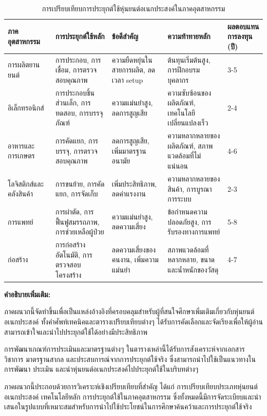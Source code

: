 \documentclass[a4paper]{article}
\begin{document}
\begin{table}[!htbp]
\centering
\small
\caption{การเปรียบเทียบการประยุกต์ใช้หุ่นยนต์อเนกประสงค์ในภาคอุตสาหกรรม}
\begin{tabular}{|p{3cm}|p{4cm}|p{3cm}|p{3cm}|p{2.5cm}|}
\hline
\textbf{ภาคอุตสาหกรรม} & \textbf{การประยุกต์ใช้หลัก} & \textbf{ข้อดีสำคัญ} & \textbf{ความท้าทายหลัก} & \textbf{ผลตอบแทนการลงทุน (ปี)} \\
\hline
การผลิตยานยนต์ & การประกอบ, การเชื่อม, การตรวจสอบคุณภาพ & ความยืดหยุ่นในสายการผลิต, ลดเวลา setup & ต้นทุนเริ่มต้นสูง, การฝึกอบรมบุคลากร & 3-5 \\
\hline
อิเล็กทรอนิกส์ & การประกอบชิ้นส่วนเล็ก, การทดสอบ, การบรรจุภัณฑ์ & ความแม่นยำสูง, ลดการสูญเสีย & ความซับซ้อนของผลิตภัณฑ์, เทคโนโลยีเปลี่ยนแปลงเร็ว & 2-4 \\
\hline
อาหารและการเกษตร & การคัดแยก, การบรรจุ, การตรวจสอบคุณภาพ & ลดการสูญเสีย, เพิ่มมาตรฐานอนามัย & ความหลากหลายของผลิตภัณฑ์, สภาพแวดล้อมที่ไม่แน่นอน & 4-6 \\
\hline
โลจิสติกส์และคลังสินค้า & การขนย้าย, การคัดแยก, การจัดเก็บ & เพิ่มประสิทธิภาพ, ลดค่าแรงงาน & ความหลากหลายของสินค้า, การบูรณาการระบบ & 2-3 \\
\hline
การแพทย์ & การผ่าตัด, การฟื้นฟูสมรรถภาพ, การช่วยเหลือผู้ป่วย & ความแม่นยำสูง, ลดความเสี่ยง & ข้อกำหนดความปลอดภัยสูง, การรับรองทางการแพทย์ & 5-8 \\
\hline
ก่อสร้าง & การก่อสร้างอัตโนมัติ, การตรวจสอบโครงสร้าง & ลดความเสี่ยงของคนงาน, เพิ่มความแม่นยำ & สภาพแวดล้อมที่หลากหลาย, ขนาดและน้ำหนักของวัสดุ & 4-7 \\
\hline
\end{tabular}
\end{table}


\newpage
\textbf{คำอธิบายเพิ่มเติม:}

ภาคผนวกนี้จัดทำขึ้นเพื่อเป็นแหล่งอ้างอิงที่ครอบคลุมสำหรับผู้ที่สนใจศึกษาเพิ่มเติมเกี่ยวกับหุ่นยนต์อเนกประสงค์ ทั้งคำศัพท์เทคนิคและตารางเปรียบเทียบต่างๆ ได้รับการคัดเลือกและจัดเรียงเพื่อให้ผู้อ่านสามารถเข้าใจและนำไปประยุกต์ใช้ได้อย่างมีประสิทธิภาพ

การพัฒนาเกณฑ์การประเมินและมาตรฐานต่างๆ ในตารางเหล่านี้ได้รับการสังเคราะห์จากเอกสารวิชาการ มาตรฐานสากล และประสบการณ์จากการประยุกต์ใช้จริง ซึ่งสามารถนำไปใช้เป็นแนวทางในการพัฒนา ประเมิน และนำหุ่นยนต์อเนกประสงค์ไปประยุกต์ใช้ในบริบทต่างๆ

ภาคผนวกนี้ประกอบด้วยการวิเคราะห์เชิงเปรียบเทียบที่สำคัญ ได้แก่ การเปรียบเทียบประเภทหุ่นยนต์อเนกประสงค์ เทคโนโลยีหลัก การประยุกต์ใช้ในภาคอุตสาหกรรม ซึ่งทั้งหมดนี้มีการจัดระเบียบและนำเสนอในรูปแบบที่เหมาะสมสำหรับการนำไปใช้ประโยชน์ในการศึกษาค้นคว้าและการประยุกต์ใช้จริง
\end{document}
